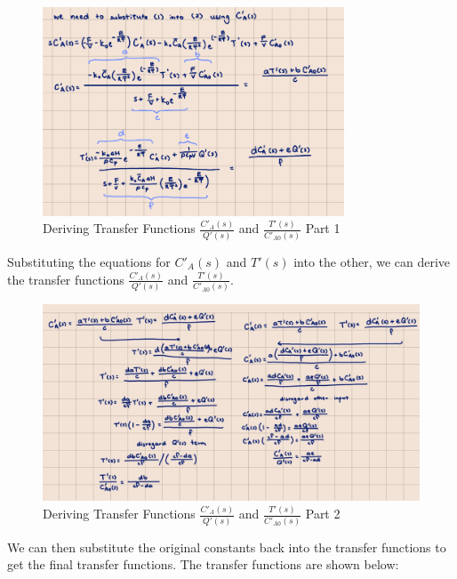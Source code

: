 \documentclass[12pt]{article}
\begin{document}
\begin{enumerate}
\begin{enumerate}
    \begin{figure}[H]
      \centering
      \includegraphics[width=0.8\textwidth]{Figures/handcalc/figure4-4b.png}
      \caption{Deriving Transfer Functions $\frac{C'_A(s)}{Q'(s)}$ and $\frac{T'(s)}{C'_{A0}(s)}$ Part 1}
      \label{fig:figure46}
    \end{figure}

    \pagebreak

    Substituting the equations for $C'_A(s)$ and $T'(s)$ into the other, we can derive the transfer functions $\frac{C'_A(s)}{Q'(s)}$ and $\frac{T'(s)}{C'_{A0}(s)}$. 

    \begin{figure}[H]
      \centering
      \includegraphics[width=\textwidth]{Figures/handcalc/figure4-4c.png}
      \caption{Deriving Transfer Functions $\frac{C'_A(s)}{Q'(s)}$ and $\frac{T'(s)}{C'_{A0}(s)}$ Part 2}
      \label{fig:figure47}
    \end{figure}

    \pagebreak

    We can then substitute the original constants back into the transfer functions to get the final transfer functions. The transfer functions are shown below:


\end{enumerate}
\end{enumerate}
\end{document}
